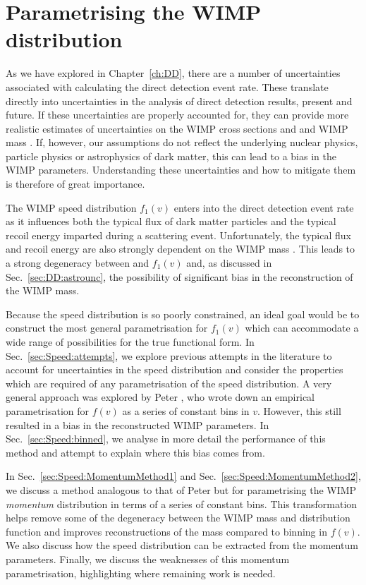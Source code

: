 \chapter{Parametrising the WIMP distribution}
\label{ch:Speed}



As we have explored in Chapter~\ref{ch:DD}, there are a number of uncertainties associated with calculating the direct detection event rate. These translate directly into uncertainties in the analysis of direct detection results, present and future. If these uncertainties are properly accounted for, they can provide more realistic estimates of uncertainties on the WIMP cross sections \sigmapsi and \sigmapsd and WIMP mass \mchi. If, however, our assumptions do not reflect the underlying nuclear physics, particle physics or astrophysics of dark matter, this can lead to a bias in the WIMP parameters. Understanding these uncertainties and how to mitigate them is therefore of great importance.

The WIMP speed distribution $f_1(v)$ enters into the direct detection event rate as it influences both the typical flux of dark matter particles and the typical recoil energy imparted during a scattering event. Unfortunately, the typical flux and recoil energy are also strongly dependent on the WIMP mass \mchi. This leads to a strong degeneracy between \mchi and $f_1(v)$ and, as discussed in Sec.~\ref{sec:DD:astrounc}, the possibility of significant bias in the reconstruction of the WIMP mass.

Because the speed distribution is so poorly constrained, an ideal goal would be to construct the most general parametrisation for $f_1(v)$ which can accommodate a wide range of possibilities for the true functional form. In Sec.~\ref{sec:Speed:attempts}, we explore previous attempts in the literature to account for uncertainties in the speed distribution and consider the properties which are required of any parametrisation of the speed distribution. A very general approach was explored by Peter \cite{Peter:2011}, who wrote down an empirical parametrisation for $f(v)$ as a series of constant bins in $v$. However, this still resulted in a bias in the reconstructed WIMP parameters. In Sec.~\ref{sec:Speed:binned}, we analyse in more detail the performance of this method and attempt to explain where this bias comes from.

In Sec.~\ref{sec:Speed:MomentumMethod1} and Sec.~\ref{sec:Speed:MomentumMethod2}, we discuss a method analogous to that of Peter but for parametrising the WIMP \textit{momentum} distribution in terms of a series of constant bins. This transformation helps remove some of the degeneracy between the WIMP mass and distribution function and improves reconstructions of the mass compared to binning in $f(v)$. We also discuss how the speed distribution can be extracted from the momentum parameters. Finally, we discuss the weaknesses of this momentum parametrisation, highlighting where remaining work is needed.

